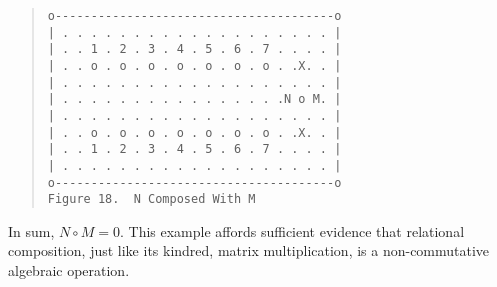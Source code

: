 \documentclass[12pt]{article}
\begin{document}
\begin{quote}\begin{verbatim}
o---------------------------------------o
| . . . . . . . . . . . . . . . . . . . |
| . . 1 . 2 . 3 . 4 . 5 . 6 . 7 . . . . |
| . . o . o . o . o . o . o . o . .X. . |
| . . . . . . . . . . . . . . . . . . . |
| . . . . . . . . . . . . . . . .N o M. |
| . . . . . . . . . . . . . . . . . . . |
| . . o . o . o . o . o . o . o . .X. . |
| . . 1 . 2 . 3 . 4 . 5 . 6 . 7 . . . . |
| . . . . . . . . . . . . . . . . . . . |
o---------------------------------------o
Figure 18.  N Composed With M
\end{verbatim}\end{quote}

In sum, $N \circ M = 0$.  This example affords sufficient evidence that relational composition, just like its kindred, matrix multiplication, is a non-commutative algebraic operation.

\end{document}
